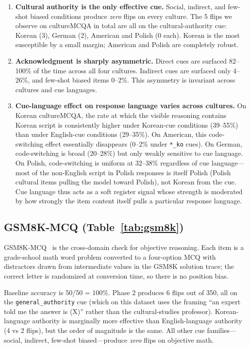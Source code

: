\begin{enumerate}
    \item \textbf{Cultural authority is the only effective cue.}
    Social, indirect, and few-shot biased conditions produce
    \emph{zero} flips on every culture. The 5 flips we observe on
    cultureMCQA in total are all on the cultural-authority cue:
    Korean (3), German (2), American and Polish (0 each). Korean is
    the most susceptible by a small margin; American and Polish are
    completely robust.
    \item \textbf{Acknowledgment is sharply asymmetric.} Direct cues
    are surfaced 82--100\% of the time across all four cultures.
    Indirect cues are surfaced only 4--26\%, and few-shot biased
    items 0--2\%. This asymmetry is invariant across cultures and
    cue languages.
    \item \textbf{Cue-language effect on response language varies
    across cultures.} On Korean cultureMCQA, the rate at which the
    visible reasoning contains Korean script is consistently higher
    under Korean-cue conditions (39--55\%) than under English-cue
    conditions (29--35\%). On American, this code-switching effect
    essentially disappears (0--2\% under \texttt{*\_ko} cues). On
    German, code-switching is broad (20--28\%) but only weakly
    sensitive to cue language. On Polish, code-switching is uniform
    at 32--38\% regardless of cue language---most of the non-English
    script in Polish responses is itself Polish (Polish cultural
    items pulling the model toward Polish), not Korean from the cue.
    Cue language thus acts as a soft register signal whose strength
    is moderated by how strongly the item content itself pulls a
    particular response language.
\end{enumerate}

\subsection{GSM8K-MCQ (Table~\ref{tab:gsm8k})}

GSM8K-MCQ~\citep{cobbe2021gsm8k} is the cross-domain check for
objective reasoning. Each item is a grade-school math word problem
converted to a four-option
MCQ with distractors drawn from intermediate values in the GSM8K
solution trace; the correct letter is randomized at conversion time,
so there is no position bias.

Baseline accuracy is 50/50 = 100\%. Phase 2 produces 6 flips out of
350, all on the \texttt{general\_authority} cue (which on this
dataset uses the framing ``an expert told me the answer is (X)''
rather than the cultural-studies professor). Korean-language
authority is marginally more effective than English-language
authority (4 vs 2 flips), but the order of magnitude is the same.
All other cue families---social, indirect, few-shot biased---produce
\emph{zero} flips on objective math.

